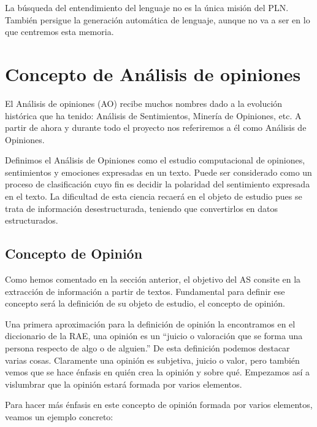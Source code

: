 	La búsqueda del entendimiento del lenguaje no es la única misión del PLN. También persigue la generación automática de lenguaje, aunque no va a ser en lo que centremos esta memoria.
	
	
	
\section{Concepto de Análisis de opiniones}\label{conceptoSA}

	El Análisis de opiniones (AO) recibe muchos nombres dado a la evolución histórica que ha tenido: Análisis de Sentimientos, Minería de Opiniones, etc. A partir de ahora y durante todo el proyecto nos referiremos a él como Análisis de Opiniones.
	
	Definimos el Análisis de Opiniones como el estudio computacional de opiniones, sentimientos y emociones expresadas en un texto. Puede ser considerado como un proceso de clasificación cuyo fin es decidir la polaridad del sentimiento expresada en el texto. La dificultad de esta ciencia recaerá en el objeto de estudio pues se trata de información desestructurada, teniendo que convertirlos en datos estructurados. 
	
	\subsection{Concepto de Opinión}\label{opinion}
	
		Como hemos comentado en la sección anterior, el objetivo del AS consite en la extracción de información a partir de textos. Fundamental para definir ese concepto será la definición de su objeto de estudio, el concepto de opinión.
		
		Una primera aproximación para la definición de opinión la encontramos en el diccionario de la RAE, una opinión es un ``juicio o valoración que se forma una persona respecto de algo o de alguien.'' De esta definición podemos destacar varias cosas. Claramente una opinión es subjetiva, juicio o valor, pero también vemos que se hace énfasis en  quién crea la opinión y sobre qué. Empezamos así a vislumbrar que la opinión estará formada por varios elementos. 
		
		Para hacer más énfasis en este concepto de opinión formada por varios elementos, veamos un ejemplo concreto:
		
